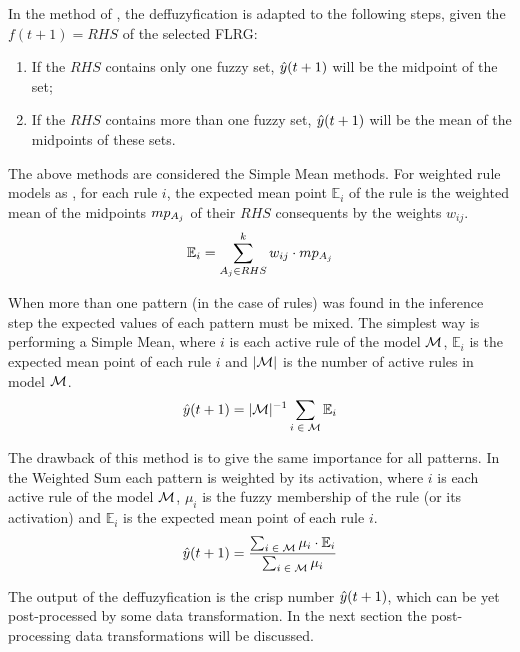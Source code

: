 In the method of \cite{chen1996forecasting}, the deffuzyfication is adapted to the following steps, given the $f(t+1) = RHS$ of the selected FLRG:

\begin{enumerate}
\item If the $RHS$ contains only one fuzzy set, $\hat{y}(t+1)$ will be the midpoint of the set;
\item If the $RHS$ contains more than one fuzzy set, $\hat{y}(t+1)$ will be the mean of the midpoints of these sets.
\end{enumerate}

The above methods are considered the Simple Mean methods. For weighted rule models as \cite{sadaei2014short}, for each rule $i$, the expected mean point $\mathbb{E}_i$ of the rule is the weighted mean of the midpoints $mp_{A_j}$ of their $RHS$ consequents by the weights $w_{ij}$.
\begin{equation}
    \mathbb{E}_i = \sum_{A_j \in RHS}^k w_{ij}\cdot mp_{A_j}
\end{equation}

When more than one pattern (in the case of rules) was found in the inference step the expected values of each pattern must be mixed. The simplest way is performing a Simple Mean, where $i$ is each active rule of the model $\mathcal{M}$, $\mathbb{E}_i$ is the expected mean point of each rule $i$ and $|\mathcal{M}|$ is the number of active rules in model $\mathcal{M}$.
\begin{equation}
    \hat{y}(t+1) = |\mathcal{M}|^{-1}\sum_{i\;\in\;\mathcal{M}} \mathbb{E}_i
\end{equation}

The drawback of this method is to give the same importance for all patterns. In the Weighted Sum each pattern is weighted by its activation, where $i$ is each active rule of the model $\mathcal{M}$, $\mu_i$ is the fuzzy membership of the rule (or its activation) and $\mathbb{E}_i$ is the expected mean point of each rule $i$.
\begin{equation}
    \hat{y}(t+1) = \frac{\sum_{i\;\in\;\mathcal{M}}\mu_i\cdot \mathbb{E}_i}{\sum_{i\;\in\;\mathcal{M}}\mu_i}
\end{equation}

The output of the deffuzyfication is the crisp number $\hat{y}(t+1)$, which can be yet post-processed by some data transformation. In the next section the post-processing data transformations will be discussed.

%
